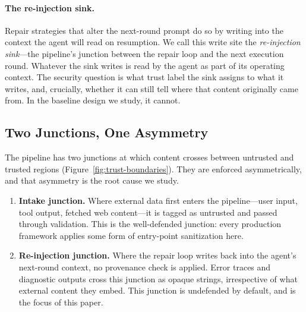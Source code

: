 \paragraph{The re-injection sink.}
Repair strategies that alter the next-round prompt do so by writing into the context the agent will read on resumption. We call this write site the \emph{re-injection sink}---the pipeline's junction between the repair loop and the next execution round. Whatever the sink writes is read by the agent as part of its operating context. The security question is what trust label the sink assigns to what it writes, and, crucially, whether it can still tell where that content originally came from. In the baseline design we study, it cannot.

\subsection{Two Junctions, One Asymmetry}
\label{sec:trust-boundaries}

The pipeline has two junctions at which content crosses between untrusted and trusted regions (Figure~\ref{fig:trust-boundaries}). They are enforced asymmetrically, and that asymmetry is the root cause we study.
\begin{enumerate}[leftmargin=*]
    \item \textbf{Intake junction.} Where external data first enters the pipeline---user input, tool output, fetched web content---it is tagged as untrusted and passed through validation. This is the well-defended junction: every production framework applies some form of entry-point sanitization here.
    \item \textbf{Re-injection junction.} Where the repair loop writes back into the agent's next-round context, no provenance check is applied. Error traces and diagnostic outputs cross this junction as opaque strings, irrespective of what external content they embed. This junction is undefended by default, and is the focus of this paper.
\end{enumerate}

